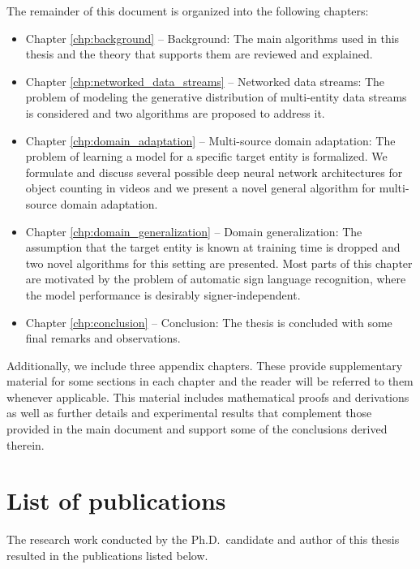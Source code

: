 The remainder of this document is organized into the following chapters:
\begin{itemize}
    \item Chapter \ref{chp:background} -- Background: The main algorithms used in this thesis and the theory that supports them are reviewed and explained.
    \item Chapter \ref{chp:networked_data_streams} -- Networked data streams: The problem of modeling the generative distribution of multi-entity data streams is considered and two algorithms are proposed to address it.
    \item Chapter \ref{chp:domain_adaptation} -- Multi-source domain adaptation: The problem of learning a model for a specific target entity is formalized. We formulate and discuss several possible deep neural network architectures for object counting in videos and we present a novel general algorithm for multi-source domain adaptation.
    \item Chapter \ref{chp:domain_generalization} -- Domain generalization: The assumption that the target entity is known at training time is dropped and two novel algorithms for this setting are presented. Most parts of this chapter are motivated by the problem of automatic sign language recognition, where the model performance is desirably signer-independent.
    \item Chapter \ref{chp:conclusion} -- Conclusion: The thesis is concluded with some final remarks and observations.
\end{itemize}
Additionally, we include three appendix chapters. These provide supplementary material for some sections in each chapter and the reader will be referred to them whenever applicable. This material includes mathematical proofs and derivations as well as further details and experimental results that complement those provided in the main document and support some of the conclusions derived therein.

\section{List of publications}
The research work conducted by the Ph.D.\ candidate and author of this thesis resulted in the publications listed below.

